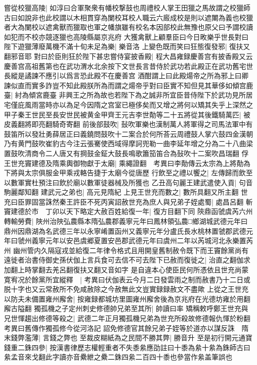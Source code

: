 嘗從校獵高陵|{
	如淳曰合軍聚衆有幡校撃鼓也周禮校人掌王田獵之馬故謂之校獵師古曰如說非也此校謂以木相貫穿為闌校耳校人職云六廄成校是則以遮閳為義也校獵者大為闌校以遮禽獸而獵取也軍之幡旗雖有校名本因部校此無豫也原父曰予謂校讀如犯而不校亦競逐獵也高陵縣屬京兆府}
大獲禽獸上顧羣臣曰今日畋樂乎世長對曰陛下遊獵薄廢萬機不滿十旬未足為樂|{
	樂音洛}
上變色既而笑曰狂態復發邪|{
	復扶又翻邪音耶}
對曰於臣則狂於陛下甚忠嘗侍宴披香殿|{
	程大昌雍録慶善宫有披香殿又云慶善宫高祖舊第也在武功渭水北余按下文世長言昔侍於武功若此殿正在武功舊宅世長縱是譎諫不應引以爲言恐此殿不在慶善宫}
酒酣謂上曰此殿煬帝之所為邪上曰卿諫似直而實多詐豈不知此殿朕所為而謂之煬帝乎對曰臣實不知但見其華侈如傾宫鹿臺|{
	紂為傾宮鹿臺}
非興王之所為故也若陛下為之誠非所宜臣昔侍陛下於武功見所居宅僅庇風雨當時亦以為足今因隋之宫室已極侈矣而又增之將何以矯其失乎上深然之　甲子秦王世民至長安世民被黄金甲齊王元吉李世勣等二十五將從其後鐵騎萬匹|{
	被皮義翻將即亮翻騎奇寄翻}
前後部鼓吹|{
	鼔吹軍樂也漢制萬人將軍得之司馬法軍中有鼓笛所以發壯勇薛居正曰義鐃問鼓吹十二案合於何所荅云周禮鼓人掌六鼓四金漢朝乃有黄門鼓吹崔豹古今注云張騫使西域得摩訶兜勒一曲李延年增之分為二十八曲梁置鼓吹清商令二人唐又有掆鼓金鉦大鼓長鳴歌簫笳笛合為鼔吹十二案吹昌瑞翻}
俘王世充竇建德及隋乘輿御物獻于太廟|{
	乘繩證翻　考異曰李勣傳云太宗為上將勣為下將與太宗俱服金甲乘戎輅告捷于太廟今從唐歷}
行飲至之禮以饗之|{
	左傳歸而飲至以數軍實杜預注曰飲於廟以數軍徒器械及所獲也}
乙丑高句麗王建武遣使入貢|{
	句音駒麗鄰知翻}
建武元之弟也|{
	高元見隋紀}
上見王世充而數之|{
	數所具翻又所主翻}
世充曰臣罪固當誅然秦王許臣不死丙寅詔赦世充為庶人與兄弟子姪處蜀|{
	處昌呂翻}
斬竇建德於市　丁卯以天下略定大赦百姓給復一年|{
	復方目翻下同}
陝鼎函虢虞芮六州轉輸勞費|{
	陜州治陜弘農縣本隋弘農郡義寧元年曰鳳林領弘農□鄉湖城武德元年曰鼎州因鼎湖為名武德三年以永寧崤置函州又義寧元年分盧氏長水桃林置虢郡武德元年曰虢州義寧元年以安邑虞郷夏置安邑郡武德元年曰虞州二年以芮城河北永樂置芮州}
幽州管内久隔寇戎並給復二年律令格式且用開皇舊制赦令既下而王竇餘黨尚有遠徙者治書侍御史孫伏伽上言兵食可去信不可去陛下已赦而復徙之|{
	治直之翻伽求加翻上時掌翻去羌呂翻復扶又翻又音如字}
是自違本心使臣民何所憑依且世充尚蒙寛宥况於餘黨所宜縱釋　|{
	考異曰伏伽表云今月二日發雲雨之制而赦書乃十二日或脱十字也又云常赦所不免咸赦除之今赦無此文豈實録録赦文不盡歟}
上從之王世充以防夫未備置雍州廨舍|{
	按雍録都城坊里圖雍州廨舍後為京兆府在光德坊雍於用翻廨古隘翻}
獨孤機之子定州刺史修德帥兄弟至其所|{
	帥讀曰率}
矯稱敕呼鄭王世充與兄世惲趨出修德等殺之|{
	武德二年正月獨孤機兄弟為世充所殺故修德報仇惲於粉翻　考異曰舊傳作獨孤修今從河洛記}
詔免修德官其餘兄弟子姪等於道亦以謀反誅　隋末錢弊濫薄|{
	言錢之弊也}
至裁皮糊紙為之民間不勝其弊|{
	勝音升}
至是初行開元通寶錢重二銖四參|{
	按漢書律歷志權輕重者不失黍絫應劭註曰十黍為絫十絫為銖師古曰絫孟音來戈翻此字讀亦音纍紲之纍二銖四絫二百四十黍也參當作絫盖筆誤也}
